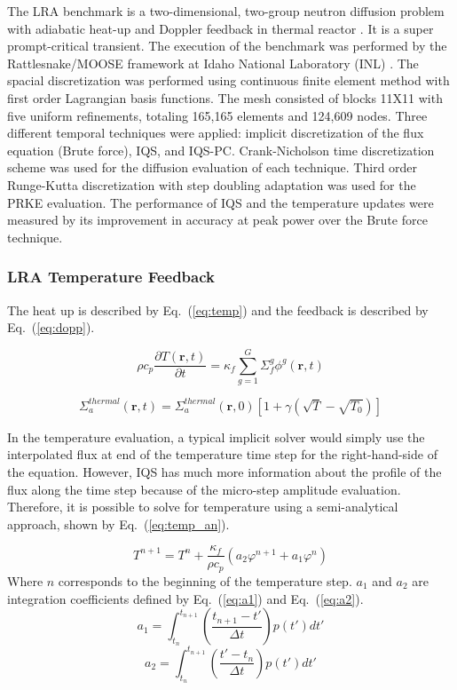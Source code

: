 \documentclass{anstrans}
\renewcommand{\vec}[1]{\bm{#1}} %
\newcommand{\eqt}[1]{Eq.~(\ref{#1})}                     %
\newcommand{\be}{\begin{equation}}
\newcommand{\ee}{\end{equation}}
\begin{document}
The LRA benchmark is a two-dimensional, two-group neutron diffusion problem with adiabatic heat-up and Doppler feedback in thermal reactor \cite{ANL_BPB}.  It is a super prompt-critical transient. The execution of the benchmark was performed by the Rattlesnake/MOOSE framework at Idaho National Laboratory (INL) \cite{wang2013}.  The spacial discretization was performed using continuous finite element method with first order Lagrangian basis functions. The mesh consisted of blocks 11X11 with five uniform refinements, totaling 165,165 elements and 124,609 nodes. Three different temporal techniques were applied: implicit discretization of the flux equation (Brute force), IQS, and IQS-PC. Crank-Nicholson time discretization scheme was used for the diffusion evaluation of each technique.  Third order Runge-Kutta discretization with step doubling adaptation was used for the PRKE evaluation.  The performance of IQS and the temperature updates were measured by its improvement in accuracy at peak power over the Brute force technique.

\subsubsection{LRA Temperature Feedback}
\label{sec:LRA_T}

The heat up is described by \eqt{eq:temp} and the feedback is described by \eqt{eq:dopp}.

\be
\rho c_p \frac{\partial T(\vec{r},t)}{\partial t} = \kappa_f \sum^G_{g=1}\Sigma_f^g \phi^g(\vec{r},t)
\label{eq:temp}
\ee

\be
\Sigma_a^{thermal}(\vec{r},t) = \Sigma_a^{thermal}(\vec{r},0)\left[1+\gamma\left(\sqrt{T}-\sqrt{T_0}\right)\right]
\label{eq:dopp}
\ee

In the temperature evaluation, a typical implicit solver would simply use the interpolated flux at end of the temperature time step for the right-hand-side of the equation.  However, IQS has much more information about the profile of the flux along the time step because of the micro-step amplitude evaluation.  Therefore, it is possible to solve for temperature using a semi-analytical approach, shown by \eqt{eq:temp_an}.

\be
T^{n+1} = T^n + \frac{\kappa_f}{\rho c_p} \left(a_2 \varphi^{n+1} + a_1 \varphi^{n}\right)
\label{eq:temp_an}
\ee
Where $n$ corresponds to the beginning of the temperature step.  $a_1$ and $a_2$ are integration coefficients defined by \eqt{eq:a1} and \eqt{eq:a2}.
\be
a_1 = \int_{t_n}^{t_{n+1}}\left(\frac{t_{n+1}-t'}{\Delta t}\right)p(t')dt'
\label{eq:a1}
\ee
\be
a_2 = \int_{t_n}^{t_{n+1}}\left(\frac{t'-t_n}{\Delta t}\right)p(t')dt'
\label{eq:a2}
\ee
\end{document}
